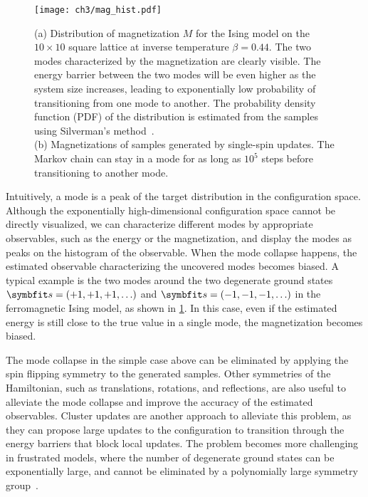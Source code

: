 \begin{figure}[htb]
\centering
\texttt{[image: ch3/mag\_hist.pdf]}
\caption[Distribution and sampling of magnetization for Ising model]{
(a) Distribution of magnetization $M$ for the Ising model on the $10 \times 10$ square lattice at inverse temperature $\beta = 0.44$.
The two modes characterized by the magnetization are clearly visible.
The energy barrier between the two modes will be even higher as the system size increases, leading to exponentially low probability of transitioning from one mode to another.
The probability density function (PDF) of the distribution is estimated from the samples using Silverman’s method~\cite{silverman1986density}. \\
(b) Magnetizations of samples generated by single-spin updates. The Markov chain can stay in a mode for as long as $10^5$ steps before transitioning to another mode.
}
\label{fig:mag-hist}
\end{figure}

Intuitively, a mode is a peak of the target distribution in the configuration space. Although the exponentially high-dimensional configuration space cannot be directly visualized, we can characterize different modes by appropriate observables, such as the energy or the magnetization, and display the modes as peaks on the histogram of the observable. When the mode collapse happens, the estimated observable characterizing the uncovered modes becomes biased. A typical example is the two modes around the two degenerate ground states $\vs = (+1, +1, +1, \ldots)$ and $\vs = (-1, -1, -1, \ldots)$ in the ferromagnetic Ising model, as shown in \cref{fig:mag-hist}. In this case, even if the estimated energy is still close to the true value in a single mode, the magnetization becomes biased.

The mode collapse in the simple case above can be eliminated by applying the spin flipping symmetry to the generated samples. Other symmetries of the Hamiltonian, such as translations, rotations, and reflections, are also useful to alleviate the mode collapse and improve the accuracy of the estimated observables. Cluster updates are another approach to alleviate this problem, as they can propose large updates to the configuration to transition through the energy barriers that block local updates. The problem becomes more challenging in frustrated models, where the number of degenerate ground states can be exponentially large, and cannot be eliminated by a polynomially large symmetry group~\cite{wannier1950antiferromagnetism, mambrini1999residual, vanderstraeten2018residual}.

